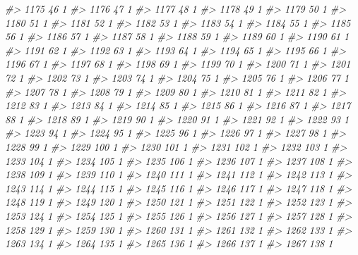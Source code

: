 \documentclass[]{article}
\newenvironment{Shaded}{\begin{snugshade}}{\end{snugshade}}
\newcommand{\CommentTok}[1]{\textcolor[rgb]{0.56,0.35,0.01}{\textit{#1}}}
\begin{document}
\begin{Shaded}
\begin{Highlighting}[]
\CommentTok{#> 1175  46  1}
\CommentTok{#> 1176  47  1}
\CommentTok{#> 1177  48  1}
\CommentTok{#> 1178  49  1}
\CommentTok{#> 1179  50  1}
\CommentTok{#> 1180  51  1}
\CommentTok{#> 1181  52  1}
\CommentTok{#> 1182  53  1}
\CommentTok{#> 1183  54  1}
\CommentTok{#> 1184  55  1}
\CommentTok{#> 1185  56  1}
\CommentTok{#> 1186  57  1}
\CommentTok{#> 1187  58  1}
\CommentTok{#> 1188  59  1}
\CommentTok{#> 1189  60  1}
\CommentTok{#> 1190  61  1}
\CommentTok{#> 1191  62  1}
\CommentTok{#> 1192  63  1}
\CommentTok{#> 1193  64  1}
\CommentTok{#> 1194  65  1}
\CommentTok{#> 1195  66  1}
\CommentTok{#> 1196  67  1}
\CommentTok{#> 1197  68  1}
\CommentTok{#> 1198  69  1}
\CommentTok{#> 1199  70  1}
\CommentTok{#> 1200  71  1}
\CommentTok{#> 1201  72  1}
\CommentTok{#> 1202  73  1}
\CommentTok{#> 1203  74  1}
\CommentTok{#> 1204  75  1}
\CommentTok{#> 1205  76  1}
\CommentTok{#> 1206  77  1}
\CommentTok{#> 1207  78  1}
\CommentTok{#> 1208  79  1}
\CommentTok{#> 1209  80  1}
\CommentTok{#> 1210  81  1}
\CommentTok{#> 1211  82  1}
\CommentTok{#> 1212  83  1}
\CommentTok{#> 1213  84  1}
\CommentTok{#> 1214  85  1}
\CommentTok{#> 1215  86  1}
\CommentTok{#> 1216  87  1}
\CommentTok{#> 1217  88  1}
\CommentTok{#> 1218  89  1}
\CommentTok{#> 1219  90  1}
\CommentTok{#> 1220  91  1}
\CommentTok{#> 1221  92  1}
\CommentTok{#> 1222  93  1}
\CommentTok{#> 1223  94  1}
\CommentTok{#> 1224  95  1}
\CommentTok{#> 1225  96  1}
\CommentTok{#> 1226  97  1}
\CommentTok{#> 1227  98  1}
\CommentTok{#> 1228  99  1}
\CommentTok{#> 1229 100  1}
\CommentTok{#> 1230 101  1}
\CommentTok{#> 1231 102  1}
\CommentTok{#> 1232 103  1}
\CommentTok{#> 1233 104  1}
\CommentTok{#> 1234 105  1}
\CommentTok{#> 1235 106  1}
\CommentTok{#> 1236 107  1}
\CommentTok{#> 1237 108  1}
\CommentTok{#> 1238 109  1}
\CommentTok{#> 1239 110  1}
\CommentTok{#> 1240 111  1}
\CommentTok{#> 1241 112  1}
\CommentTok{#> 1242 113  1}
\CommentTok{#> 1243 114  1}
\CommentTok{#> 1244 115  1}
\CommentTok{#> 1245 116  1}
\CommentTok{#> 1246 117  1}
\CommentTok{#> 1247 118  1}
\CommentTok{#> 1248 119  1}
\CommentTok{#> 1249 120  1}
\CommentTok{#> 1250 121  1}
\CommentTok{#> 1251 122  1}
\CommentTok{#> 1252 123  1}
\CommentTok{#> 1253 124  1}
\CommentTok{#> 1254 125  1}
\CommentTok{#> 1255 126  1}
\CommentTok{#> 1256 127  1}
\CommentTok{#> 1257 128  1}
\CommentTok{#> 1258 129  1}
\CommentTok{#> 1259 130  1}
\CommentTok{#> 1260 131  1}
\CommentTok{#> 1261 132  1}
\CommentTok{#> 1262 133  1}
\CommentTok{#> 1263 134  1}
\CommentTok{#> 1264 135  1}
\CommentTok{#> 1265 136  1}
\CommentTok{#> 1266 137  1}
\CommentTok{#> 1267 138  1}

\end{Highlighting}
\end{Shaded}
\end{document}

